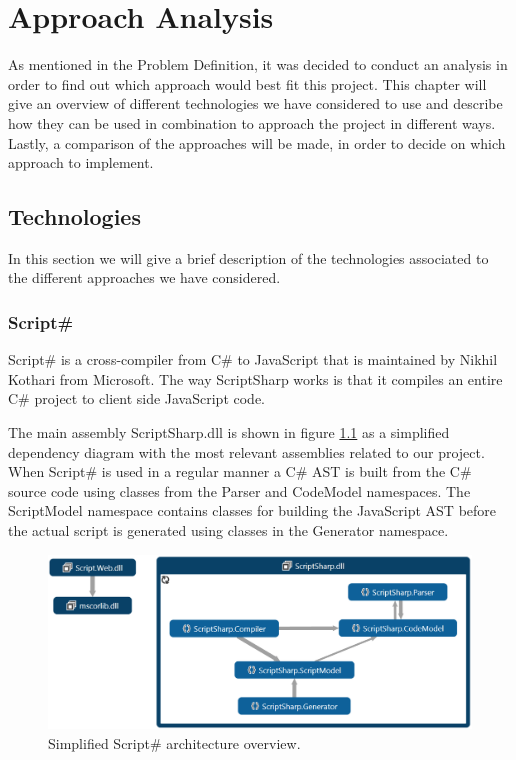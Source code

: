 \chapter{Approach Analysis}
	As mentioned in the Problem Definition, it was decided to conduct an analysis in order to find out which approach would best fit this project. This chapter will give an overview of different technologies we have considered to use and describe how they can be used in combination to approach the project in different ways. Lastly, a comparison of the approaches will be made, in order to decide on which approach to implement.

\section{Technologies}
	In this section we will give a brief description of the technologies associated to the different approaches we have considered.

	\subsection{Script\#} %
	\label{sub:subsection_name}
		Script\# \cite{scriptsharp} is a cross-compiler from C\# to JavaScript that is maintained by Nikhil Kothari \cite{nikhilk} from Microsoft. The way ScriptSharp works is that it compiles an entire C\# project to client side JavaScript code.

		The main assembly ScriptSharp.dll is shown in figure \ref{simplifiedOverview} as a simplified dependency diagram with the most relevant assemblies related to our project. When Script\# is used in a regular manner a C\# AST is built from the C\# source code using classes from the Parser and CodeModel namespaces. The ScriptModel namespace contains classes for building the JavaScript AST before the actual script is generated using classes in the Generator namespace.

		\begin{figure}[H]
			\begin{center}
				\centerline{\includegraphics[width=16cm]{resources/images/SimplifiedOverview.png}}
			\end{center}
			\caption{Simplified Script\# architecture overview.}
			\label{simplifiedOverview}
		\end{figure}

